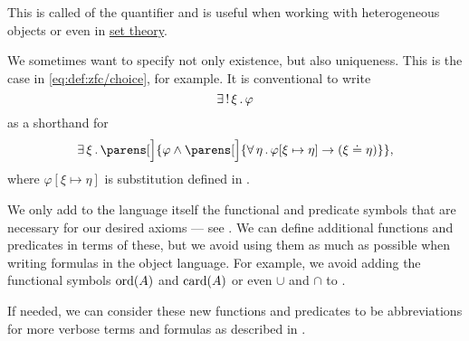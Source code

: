 \begin{remark}
\begin{thmenum}
    This is called  of the quantifier and is useful when working with heterogeneous objects or even in \hyperref[sec:set_theory]{set theory}.

     We sometimes want to specify not only existence, but also uniqueness. This is the case in \eqref{eq:def:zfc/choice}, for example. It is conventional to write
    \begin{equation*}
      \exists \thinspace ! \thinspace \xi \thinspace . \thinspace \varphi
    \end{equation*}
    as a shorthand for
    \begin{equation*}
      \qexists \xi \parens[\Big]{ \varphi \wedge \parens[\Big]{ \qforall \eta \varphi[\xi \mapsto \eta] \rightarrow (\xi \doteq \eta) } },
    \end{equation*}
    where \( \varphi[\xi \mapsto \eta] \) is substitution defined in .

     We only add to the language itself the functional and predicate symbols that are necessary for our desired axioms --- see . We can define additional functions and predicates in terms of these, but we avoid using them as much as possible when writing formulas in the object language. For example, we avoid adding the functional symbols \hyperref[thm:well_ordered_order_type_existence]{\( \operatorname{ord}(A) \)} and \hyperref[def:cardinal]{\( \operatorname{card}(A) \)} or even \hyperref[def:basic_set_operations/union]{\( \cup \)} and \hyperref[def:basic_set_operations/intersection]{\( \cap \)} to \hyperref[def:zfc]{}.

    If needed, we can consider these new functions and predicates to be abbreviations for more verbose terms and formulas as described in .
  \end{thmenum}
\end{remark}

